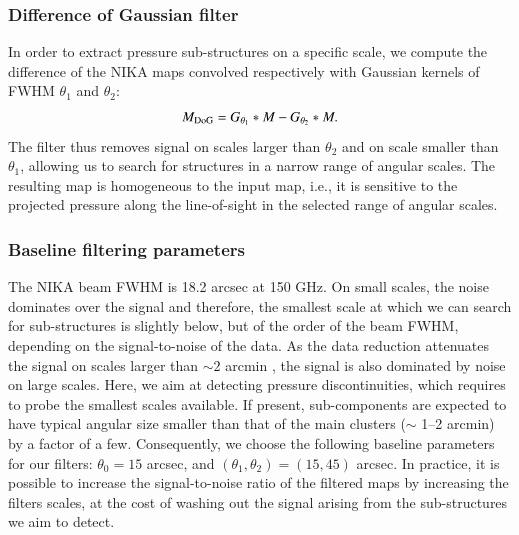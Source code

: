 \documentclass[twocolumn,traditabstract]{aa}
\begin{document}
\subsubsection{Difference of Gaussian filter}
In order to extract pressure sub-structures on a specific scale, we compute the difference of the NIKA maps convolved respectively with Gaussian kernels of FWHM $\theta_1$ and $\theta_2$:
\begin{equation}
	M_{\rm DoG} = G_{\theta_1} \ast M - G_{\theta_2} \ast M.
	\label{eq:DoG_filter}
\end{equation}
The filter thus removes signal on scales larger than $\theta_2$ and on scale smaller than $\theta_1$, allowing us to search for structures in a narrow range of angular scales. The resulting map is homogeneous to the input map, i.e., it is sensitive to the projected pressure along the line-of-sight in the selected range of angular scales.

\subsubsection{Baseline filtering parameters}\label{sec:Baseline_filtering_parameters}
The NIKA beam FWHM is 18.2 arcsec at 150 GHz. On small scales, the noise dominates over the signal and therefore, the smallest scale at which we can search for sub-structures is slightly below, but of the order of the beam FWHM, depending on the signal-to-noise of the data. As the data reduction attenuates the signal on scales larger than $\sim 2$ arcmin \citep[see][and section \ref{sec:Systematics_and_noise_properties}]{Adam2015}, the signal is also dominated by noise on large scales. Here, we aim at detecting pressure discontinuities, which requires to probe the smallest scales available. If present, sub-components are expected to have typical angular size smaller than that of the main clusters ($\sim$ 1--2 arcmin) by a factor of a few. Consequently, we choose the following baseline parameters for our filters: $\theta_0 = 15$ arcsec, and $\left(\theta_1, \theta_2\right) = \left(15, 45\right)$ arcsec. In practice, it is possible to increase the signal-to-noise ratio of the filtered maps by increasing the filters scales, at the cost of washing out the signal arising from the sub-structures we aim to detect.

\end{document}
